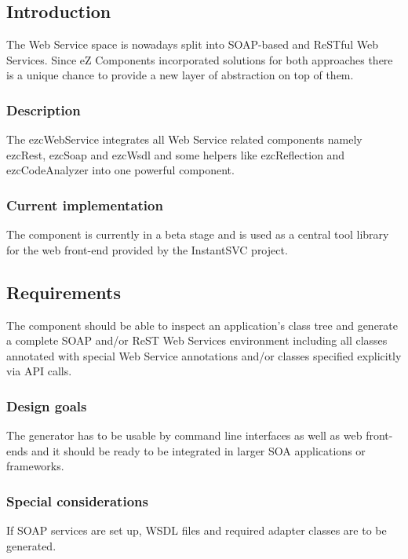 \documentclass[10pt,final,a4paper,oneside]{article}
\begin{document}
\subsection{Introduction}

The Web Service space is nowadays split
into SOAP-based and ReSTful Web Services.
Since eZ Components incorporated solutions
for both approaches
there is a unique chance to provide a new layer of abstraction
on top of them.

\subsubsection{Description}
The ezcWebService integrates all Web Service related
components namely ezcRest, ezcSoap and ezcWsdl and some helpers
like ezcReflection and ezcCodeAnalyzer into one powerful component.

\subsubsection{Current implementation}
The component is currently in a beta stage
and is used as a central tool library
for the web front-end provided by the InstantSVC project.

\subsection{Requirements}\label{subsec:WebServiceRequirements}
The component should be able to
inspect an application's class tree
and generate a complete SOAP and/or ReST Web Services environment
including all classes annotated with special Web Service annotations
and/or classes specified explicitly via API calls.

\subsubsection{Design goals}
The generator has to be usable by
command line interfaces as well as web front-ends
and it should be ready to be integrated
in larger SOA applications or frameworks.


\subsubsection{Special considerations}
If SOAP services are set up,
WSDL files and required adapter classes are to be generated.
\end{document}
